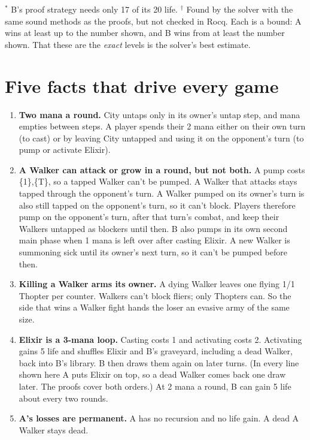 \documentclass[11pt]{article}
\begin{document}
{\small
\noindent
$^{*}$ B's proof strategy needs only 17 of its 20 life.
$^{\dagger}$ Found by the solver with the same sound methods as the
proofs, but not checked in Rocq. Each is a bound: A wins at least up to
the number shown, and B wins from at least the number shown. That these
are the \emph{exact} levels is the solver's best estimate.\par}

\section{Five facts that drive every game}
\label{sec:facts}

\begin{enumerate}[label=\textbf{F\arabic*.}, leftmargin=*]
\item \textbf{Two mana a round.} City untaps only in its owner's untap
  step, and mana empties between steps. A player spends their 2 mana
  either on their own turn (to cast) or by leaving City untapped and
  using it on the opponent's turn (to pump or activate Elixir).
\item \textbf{A Walker can attack or grow in a round, but not both.} A
  pump costs \{1\},\{T\}, so a tapped Walker can't be pumped. A Walker
  that attacks stays tapped through the opponent's turn. A Walker pumped
  on its owner's turn is also still tapped on the opponent's turn, so it
  can't block. Players therefore pump on the opponent's turn, after that
  turn's combat, and keep their Walkers untapped as blockers until then.
  B also pumps in its own second main phase when 1 mana is left over
  after casting Elixir. A new Walker is summoning sick until its owner's
  next turn, so it can't be pumped before then.
\item \textbf{Killing a Walker arms its owner.} A dying Walker leaves one
  flying 1/1 Thopter per counter. Walkers can't block fliers; only
  Thopters can. So the side that wins a Walker fight hands the loser an
  evasive army of the same size.
\item \textbf{Elixir is a 3-mana loop.} Casting costs 1 and activating
  costs 2. Activating gains 5 life and shuffles Elixir and B's graveyard,
  including a dead Walker, back into B's library. B then draws them again
  on later turns. (In every line shown here A puts Elixir on top, so a
  dead Walker comes back one draw later. The proofs cover both orders.)
  At 2 mana a round, B can gain 5 life about every two rounds.
\item \textbf{A's losses are permanent.} A has no recursion and no life
  gain. A dead A Walker stays dead.
\end{enumerate}
\end{document}
